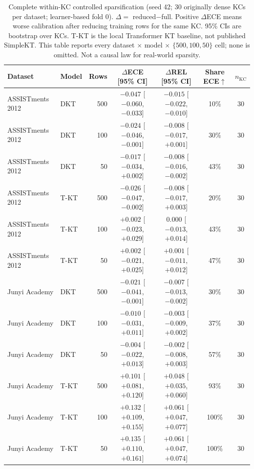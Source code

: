\begin{table}[htbp]
\caption{Complete within-KC controlled sparsification (seed 42; 30 originally dense KCs per dataset; learner-based fold 0). $\Delta=$ reduced$-$full. Positive $\Delta$ECE means worse calibration after reducing training rows for the same KC. 95\% CIs are bootstrap over KCs. T-KT is the local Transformer KT baseline, not published SimpleKT. This table reports every dataset $\times$ model $\times$ $\{500,100,50\}$ cell; none is omitted. Not a causal law for real-world sparsity.}
\label{tab:s2_controlled_sparsification}
\centering\scriptsize
\begin{tabular}{llrcccc}
\toprule
Dataset & Model & Rows & $\Delta$ECE [95\% CI] & $\Delta$REL [95\% CI] & Share ECE$\uparrow$ & $n_{\mathrm{KC}}$ \\
\midrule
ASSISTments 2012 & DKT & 500 & $-0.047$ [$-0.060$, $-0.033$] & $-0.015$ [$-0.022$, $-0.010$] & 10\% & 30 \\
ASSISTments 2012 & DKT & 100 & $-0.024$ [$-0.046$, $-0.001$] & $-0.008$ [$-0.017$, $+0.001$] & 30\% & 30 \\
ASSISTments 2012 & DKT & 50 & $-0.017$ [$-0.034$, $+0.002$] & $-0.008$ [$-0.016$, $-0.002$] & 43\% & 30 \\
ASSISTments 2012 & T-KT & 500 & $-0.026$ [$-0.047$, $-0.002$] & $-0.008$ [$-0.017$, $+0.003$] & 20\% & 30 \\
ASSISTments 2012 & T-KT & 100 & $+0.002$ [$-0.023$, $+0.029$] & $0.000$ [$-0.013$, $+0.014$] & 43\% & 30 \\
ASSISTments 2012 & T-KT & 50 & $+0.002$ [$-0.021$, $+0.025$] & $+0.001$ [$-0.011$, $+0.012$] & 47\% & 30 \\
\midrule
Junyi Academy & DKT & 500 & $-0.021$ [$-0.041$, $-0.001$] & $-0.007$ [$-0.013$, $-0.002$] & 30\% & 30 \\
Junyi Academy & DKT & 100 & $-0.010$ [$-0.031$, $+0.011$] & $-0.003$ [$-0.009$, $+0.002$] & 37\% & 30 \\
Junyi Academy & DKT & 50 & $-0.004$ [$-0.022$, $+0.013$] & $-0.002$ [$-0.008$, $+0.003$] & 57\% & 30 \\
Junyi Academy & T-KT & 500 & $+0.101$ [$+0.081$, $+0.120$] & $+0.048$ [$+0.035$, $+0.060$] & 93\% & 30 \\
Junyi Academy & T-KT & 100 & $+0.132$ [$+0.109$, $+0.155$] & $+0.061$ [$+0.047$, $+0.077$] & 100\% & 30 \\
Junyi Academy & T-KT & 50 & $+0.135$ [$+0.110$, $+0.161$] & $+0.061$ [$+0.047$, $+0.074$] & 100\% & 30 \\

\end{tabular}
\end{table}
